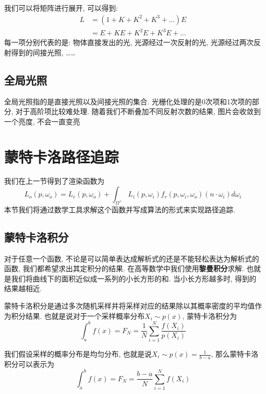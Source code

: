 我们可以将矩阵进行展开, 可以得到: 
\begin{equation}
	\begin{split}
		L&=(1+K+K^2+K^3+\dots)E\\
		&=E+KE+K^2E+K^3E+\dots
	\end{split}
\end{equation}
每一项分别代表的是: 物体直接发出的光, 光源经过一次反射的光, 光源经过两次反射得到的间接光照, ……

\section{全局光照}
全局光照指的是直接光照以及间接光照的集合. 光栅化处理的是0次项和1次项的部分, 对于高阶项比较难处理. 随着我们不断叠加不同反射次数的结果, 图片会收敛到一个亮度, 不会一直变亮

\chapter{蒙特卡洛路径追踪}

我们在上一节得到了渲染函数为
\begin{equation}
	L_o(p,\omega_o)=L_e(p,\omega_o)+\int_{\Omega^+}L_i(p,\omega_i)f_r(p,\omega_i,\omega_o)(n\cdot \omega_i)d\omega_i
\end{equation}
本节我们将通过数学工具求解这个函数并写成算法的形式来实现路径追踪. 

\section{蒙特卡洛积分}

对于任意一个函数, 不论是可以简单表达成解析式的还是不能轻松表达为解析式的函数, 我们都希望求出其定积分的结果. 在高等数学中我们使用\textbf{黎曼积分}求解. 也就是我们将曲线下的面积近似成一系列的小长方形的和. 当小长方形越多时, 得到的结果越相近. 

蒙特卡洛积分是通过多次随机采样并将采样对应的结果除以其概率密度的平均值作为积分结果. 也就是说对于一个采样概率分布$X_i\sim p(x)$, 蒙特卡洛积分为
\begin{equation}
	\int_a^b f(x) = F_N=\frac{1}{N}\sum_{i=1}^N\frac{f(X_i)}{p(X_i)}
\end{equation}

我们假设采样的概率分布是均匀分布, 也就是说$X_i\sim p(x)=\frac{1}{b-a}$, 那么蒙特卡洛积分可以表示为
\begin{equation}
	\int_a^b f(x) = F_N=\frac{b-a}{N}\sum_{i=1}^Nf(X_i)
\end{equation}

